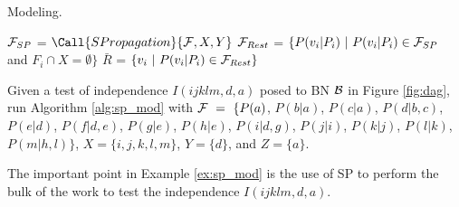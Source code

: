 \begin{algorithm}[h]
    \caption{Modeling.}
    \label{alg:sp_mod}
    \begin{algorithmic}[1]
    \State ${\cal F}_{SP}$ = $\Call{SPropagation}{{\cal F}, X, Y}$
    \State ${\cal F}_{Rest}$ = $\{P(v_i|P_i) ~|~ P(v_i|P_i) \in {\cal F}_{SP}$ and $F_i \cap X = \emptyset\}$
    \State $\bar{R}$ = $\{v_i ~|~ P(v_i|P_i) \in {\cal F}_{Rest}\}$    
    \EndProcedure
    \end{algorithmic}
\end{algorithm}

\begin{example}
Given a test of independence $I(ijklm, d, a)$ posed to BN ${\cal B}$ in Figure \ref{fig:dag}, run Algorithm \ref{alg:sp_mod} with ${\cal F} ~=~ \{P(a)$, $P(b|a)$, $P(c|a)$, $P(d|b,c)$, $P(e|d)$, $P(f|d,e)$, $P(g|e)$, $P(h|e)$, $P(i|d,g)$, $P(j|i)$, $P(k|j)$, $P(l|k)$, $P(m|h,l)\}$, $X = \{i,j,k,l,m\}$, $Y = \{d\}$, and $Z = \{a\}$.
\label{ex:sp_mod}
\end{example}

The important point in Example \ref{ex:sp_mod} is the use of SP to perform the bulk of the work to test the independence $I(ijklm, d, a)$.
